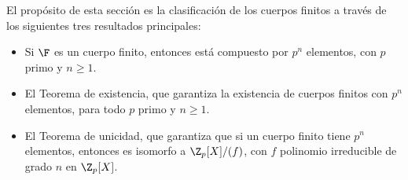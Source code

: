 El propósito de esta sección es la clasificación de los cuerpos finitos a través de los siguientes tres resultados principales: 
\begin{itemize}[label={--}]
    \item Si $\F$ es un cuerpo finito, entonces está compuesto por $p^n$ elementos, con $p$ primo y $n\geq 1$.
    \item El Teorema de existencia, que garantiza la existencia de cuerpos finitos con $p^n$ elementos, para todo $p$ primo y $n\geq 1$.
    \item El Teorema de unicidad, que garantiza que si un cuerpo finito tiene $p^n$ elementos, entonces es isomorfo a $\Z_p[X]/(f)$, con $f$ polinomio irreducible de grado $n$ en $\Z_p[X]$.
\end{itemize}

\begin{teorema}\label{teorema:cuerpo_finito_p^n_elementos}\end{teorema}

